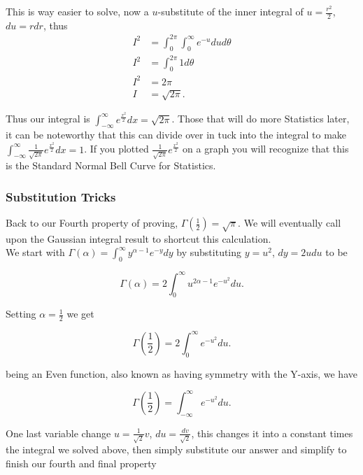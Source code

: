 \documentclass[12pt]{article}
\begin{document}
This is way easier to solve, now a $u$-substitute of the inner integral of $u=\frac{r^2}{2}$, $du=rdr$, thus
\begin{align*}
    I^2 &= \int_{0}^{2\pi}\int_{0}^{\infty} e^{-u} dud\theta \\
    I^2 &= \int_{0}^{2\pi}1 d\theta \\
    I^2 &= 2\pi \\
    I   &= \sqrt{2\pi}.
\end{align*}

Thus our integral is $\int_{-\infty}^{\infty} e^{\frac{x^2}{2}} dx=\sqrt{2\pi}$. Those that will do more Statistics later, it can be noteworthy that this can divide over in tuck into the integral to make $\int_{-\infty}^{\infty} \frac{1}{\sqrt{2\pi}}e^{\frac{x^2}{2}} dx=1$. If you plotted $\frac{1}{\sqrt{2\pi}}e^{\frac{x^2}{2}}$ on a graph you will recognize that this is the Standard Normal Bell Curve for Statistics.

\subsubsection{Substitution Tricks}

Back to our Fourth property of proving, $\Gamma\left(\frac{1}{2}\right)=\sqrt{\pi}$. We will eventually call upon the Gaussian integral result to shortcut this calculation. \\

We start with $\Gamma(\alpha)=\int_{0}^{\infty}y^{\alpha-1}e^{-y}dy$ by substituting $y=u^2$, $dy=2udu$ to be 

\begin{equation*}
    \Gamma(\alpha)=2\int_{0}^{\infty}u^{2\alpha-1}e^{-u^2}du.
\end{equation*}
 
Setting $\alpha=\frac{1}{2}$ we get

\begin{equation*}
    \Gamma\left(\frac{1}{2}\right)=2\int_{0}^{\infty}e^{-u^2}du.
\end{equation*}

being an Even function, also known as having symmetry with the Y-axis, we have 

\begin{equation*}
    \Gamma\left(\frac{1}{2}\right)=\int_{-\infty}^{\infty}e^{-u^2}du.
\end{equation*}

One last variable change $u=\frac{1}{\sqrt{2}}v$, $du=\frac{dv}{\sqrt{2}}$, this changes it into a constant times the integral we solved above, then simply substitute our answer and simplify to finish our fourth and final property
\end{document}
